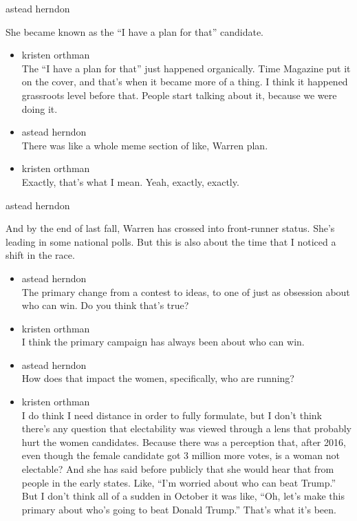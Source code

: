 astead herndon

She became known as the ``I have a plan for that'' candidate.

\begin{itemize}
\item
  kristen orthman\\
  The ``I have a plan for that'' just happened organically. Time
  Magazine put it on the cover, and that's when it became more of a
  thing. I think it happened grassroots level before that. People start
  talking about it, because we were doing it.
\item
  astead herndon\\
  There was like a whole meme section of like, Warren plan.
\item
  kristen orthman\\
  Exactly, that's what I mean. Yeah, exactly, exactly.
\end{itemize}

astead herndon

And by the end of last fall, Warren has crossed into front-runner
status. She's leading in some national polls. But this is also about the
time that I noticed a shift in the race.

\begin{itemize}
\item
  astead herndon\\
  The primary change from a contest to ideas, to one of just as
  obsession about who can win. Do you think that's true?
\item
  kristen orthman\\
  I think the primary campaign has always been about who can win.
\item
  astead herndon\\
  How does that impact the women, specifically, who are running?
\item
  kristen orthman\\
  I do think I need distance in order to fully formulate, but I don't
  think there's any question that electability was viewed through a lens
  that probably hurt the women candidates. Because there was a
  perception that, after 2016, even though the female candidate got 3
  million more votes, is a woman not electable? And she has said before
  publicly that she would hear that from people in the early states.
  Like, ``I'm worried about who can beat Trump.'' But I don't think all
  of a sudden in October it was like, ``Oh, let's make this primary
  about who's going to beat Donald Trump.'' That's what it's been.
\end{itemize}

